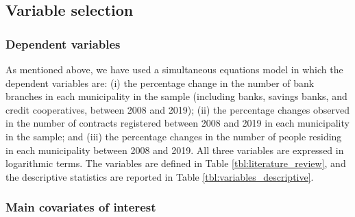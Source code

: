 \documentclass[a4paper,11pt,oneside]{article}
\begin{document}



\subsection{Variable selection}
\label{sec:variable_selection}

\subsubsection{Dependent variables}
\label{sec:dependent_variables}

As mentioned above, we have used a simultaneous equations model in which the dependent variables are: (i) the percentage change in the number of bank branches in each municipality in the sample (including banks, savings banks, and credit cooperatives, between 2008 and 2019); (ii) the percentage changes observed in the number of contracts registered between 2008 and 2019 in each municipality in the sample; and (iii) the percentage changes in the number of people residing in each municipality between 2008 and 2019. All three variables are expressed in logarithmic terms. The variables are defined in Table \ref{tbl:literature_review}, and the descriptive statistics are reported in Table \ref{tbl:variables_descriptive}.










\subsubsection{Main covariates of interest}
\label{sec:variables_interest}
\end{document}
